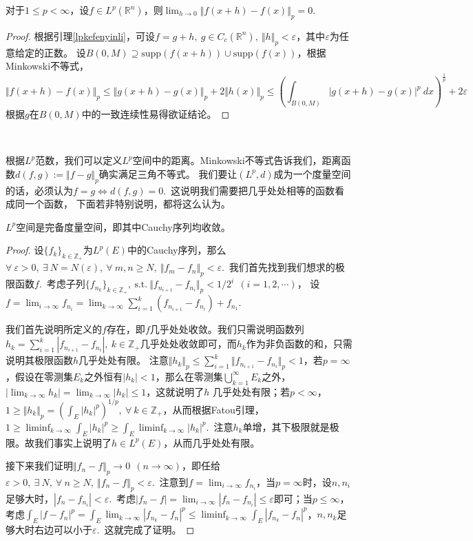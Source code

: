 \documentclass[color=green,thmcnt=section,lang=cn,12pt]{elegantbook}
\numberwithin{equation}{section}%
\numberwithin{figure}{section}%
\newcommand{\RR}{\mathbb{R}}
\renewcommand{\RN}{\RR^n}
\newcommand{\ZZ}{\mathbb{Z}}
\newcommand{\ee}{\varepsilon}
\newcommand{\any}{\forall \ }
\newcommand{\exi}{\exists \ }
\newcommand{\sothat}{\ \textrm{s.t.}\ }
\newcommand{\csf}[1]{\{#1_k\}_{k\in \ZZ_+}} %
\newcommand{\cu}[1]{\bigcup_{#1=1}^{\infty}} %
\newcommand{\normp}[2]{\Vert #1 \Vert_{#2}}
\begin{document}
\begin{example}[（平均连续性）]\label{pingjunlianxuxingtuiguang}
    对于$1\leq p<\infty$，设$f\in L^p(\RN)$，则$\lim_{h\to 0}\normp{f(x+h)-f(x)}{p}=0$.\ 
\end{example}
\begin{proof}
   根据引理\ref{lpkefenyinli}，可设$f=g+h,\ g\in C_c(\RN),\ \normp{h}{p}<\ee$，其中$\ee$为任意给定的正数。
   设$B(0,M)\supseteq \textrm{supp}(f(x+h))\cup\textrm{supp}(f(x))$，根据Minkowski不等式，\begin{equation*}
    \normp{f(x+h)-f(x)}{p}\leq \normp{g(x+h)-g(x)}{p}+ 2\normp{h(x)}{p}\leq (\int_{B(0,M)}|g(x+h)-g(x)|^p\ dx)^{\frac{1}{p}}+2\ee
   \end{equation*}
   根据$g$在$B(0,M)$中的一致连续性易得欲证结论。
\end{proof}
\ 


根据$L^p$范数，我们可以定义$L^p$空间中的距离。Minkowski不等式告诉我们，距离函数$d(f,g):=\normp{f-g}{p}$确实满足三角不等式。
我们要让$(L^p,d)$成为一个度量空间的话，必须认为$f=g\Longleftrightarrow d(f,g)=0$.\ 这说明我们需要把几乎处处相等的函数看成同一个函数，
下面若非特别说明，都将这么认为。
\begin{proposition}
    $L^p$空间是完备度量空间，即其中Cauchy序列均收敛。
\end{proposition}
\begin{proof}
    设$\csf{f}$为$L^p(E)$中的Cauchy序列，那么$\any \ee>0,\ \exi N=N(\ee),\ \any m,n\geq N,\ \normp{f_m-f_n}{p}<\ee$.\ 
我们首先找到我们想求的极限函数$f$.\ 考虑子列$\{f_{n_k}\}_{k\in\ZZ_+},\sothat \normp{f_{n_{i+1}}-f_{n_{i}}}{p}<1/2^i\ \ (i=1,2,\cdots)$，
设$f=\lim_{i\to\infty}f_{n_i}=\lim_{k\to\infty}\sum_{i=1}^{k}(f_{n_{i+1}}-f_{n_i})+f_{n_1}$.\ 


我们首先说明所定义的$f$存在，即$f$几乎处处收敛。我们只需说明函数列$h_k=\sum_{i=1}^{k}|f_{n_{i+1}}-f_{n_i}|,\ k\in\ZZ_+$几乎处处收敛即可，而$h_k$作为非负函数的和，只需说明其极限函数$h$几乎处处有限。
注意$\normp{h_k}{p}\leq \sum_{i=1}^{k}\normp{f_{n_{i+1}}-f_{n_i}}{p}<1$，若$p=\infty$，假设在零测集$E_k$之外恒有$|h_k|<1$，那么在零测集$\cu{k}E_k$之外，$|\lim_{k\to\infty}h_k|=\lim_{k\to\infty}|h_k|\leq 1$，这就说明了$h$
几乎处处有限；若$p<\infty$，$1\geq \normp{h_k}{p}=(\int_E |h_k|^p)^{1/p},\ \any k\in\ZZ_+$，从而根据Fatou引理，$1\geq \liminf_{k \to \infty}\int_E |h_k|^p\geq \int_E \liminf_{k \to \infty}|h_k|^p$.\ 
注意$h_k$单增，其下极限就是极限。故我们事实上说明了$h\in L^p(E)$，从而几乎处处有限。


接下来我们证明$\normp{f_n-f}{p}\to 0\ \ (n\to\infty)$，即任给$\ee>0,\ \exi N,\ \any n\geq N,\ \normp{f_n-f}{p}<\ee$.\ 注意到$f=\lim_{i\to\infty}f_{n_i}$，当$p=\infty$时，设$n,n_i$足够大时，$|f_n-f_{n_i}|<\ee$.\ 
考虑$|f_n-f|=\lim_{i\to\infty}|f_n-f_{n_i}|\leq \ee$即可；当$p\leq \infty$，考虑$\int_E|f-f_n|^p=\int_E\lim_{k\to\infty}|f_{n_k}-f_n|^p\leq \liminf_{k\to\infty}\int_E|f_{n_k}-f_n|^p$，$n,n_k$足够大时右边可以小于$\ee$.\ 
这就完成了证明。
\end{proof}
\ 
\end{document}
